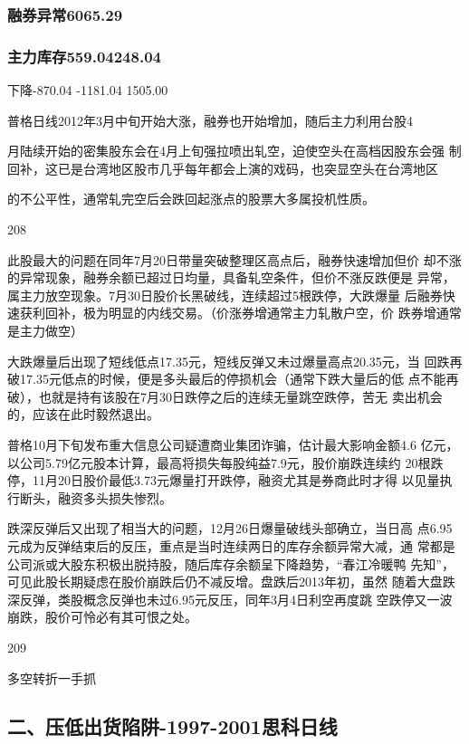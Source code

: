 \documentclass{article}
\begin{document}
\subsubsection{融券异常6065.29}

\subsubsection{主力库存559.04248.04}

下降-870.04 -1181.04 1505.00

普格日线2012年3月中旬开始大涨，融券也开始增加，随后主力利用台股4

月陆续开始的密集股东会在4月上旬强拉喷出轧空，迫使空头在高档因股东会强 制回补，这已是台湾地区股市几乎每年都会上演的戏码，也突显空头在台湾地区

的不公平性，通常轧完空后会跌回起涨点的股票大多属投机性质。

208

\clearpage

此股最大的问题在同年7月20日带量突破整理区高点后，融券快速增加但价 却不涨的异常现象，融券余额已超过日均量，具备轧空条件，但价不涨反跌便是 异常，属主力放空现象。7月30日股价长黑破线，连续超过5根跌停，大跌爆量 后融券快速获利回补，极为明显的内线交易。（价涨券增通常主力轧散户空，价 跌券增通常是主力做空）

大跌爆量后出现了短线低点17.35元，短线反弹又未过爆量高点20.35元，当 回跌再破17.35元低点的时候，便是多头最后的停损机会（通常下跌大量后的低 点不能再破），也就是持有该股在7月30日跌停之后的连续无量跳空跌停，苦无 卖出机会的，应该在此时毅然退出。

普格10月下旬发布重大信息公司疑遭商业集团诈骗，估计最大影响金额4.6 亿元，以公司5.79亿元股本计算，最高将损失每股纯益7.9元，股价崩跌连续约 20根跌停，11月20日股价最低3.73元爆量打开跌停，融资尤其是券商此时才得 以见量执行断头，融资多头损失惨烈。

跌深反弹后又出现了相当大的问题，12月26日爆量破线头部确立，当日高 点6.95元成为反弹结束后的反压，重点是当时连续两日的库存余额异常大减，通 常都是公司派或大股东积极出脱持股，随后库存余额呈下降趋势，“春江冷暖鸭 先知”，可见此股长期疑虑在股价崩跌后仍不减反增。盘跌后2013年初，虽然 随着大盘跌深反弹，类股概念反弹也未过6.95元反压，同年3月4日利空再度跳 空跌停又一波崩跌，股价可怜必有其可恨之处。

209

\clearpage

多空转折一手抓

\subsection{二、压低出货陷阱-1997-2001思科日线}
\end{document}
